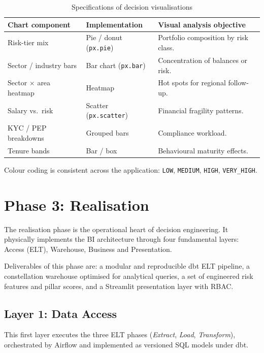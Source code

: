 \begin{table}[H]
\centering
\caption{Specifications of decision visualisations}
\label{tab:kpis_graphiques}
\renewcommand{\arraystretch}{1.25}
\scriptsize
\begin{tabular}{|p{3.2cm}|p{3.6cm}|p{7.0cm}|}
\hline
\rowcolor{blue!15}
\textbf{Chart component} & \textbf{Implementation} & \textbf{Visual analysis objective} \\
\hline
Risk-tier mix & Pie / donut (\texttt{px.pie}) & Portfolio composition by risk class. \\
\hline
Sector / industry bars & Bar chart (\texttt{px.bar}) & Concentration of balances or risk. \\
\hline
Sector $\times$ area heatmap & Heatmap & Hot spots for regional follow-up. \\
\hline
Salary vs.\ risk & Scatter (\texttt{px.scatter}) & Financial fragility patterns. \\
\hline
KYC / PEP breakdowns & Grouped bars & Compliance workload. \\
\hline
Tenure bands & Bar / box & Behavioural maturity effects. \\
\hline
\end{tabular}
\end{table}

Colour coding is consistent across the application:
\texttt{LOW}, \texttt{MEDIUM},
\texttt{HIGH}, \texttt{VERY\_HIGH}.

\section{Phase 3: Realisation}
\label{sec:gimsi_phase3}
The realisation phase is the operational heart of decision engineering. It
physically implements the BI architecture through four fundamental layers:
Access (ELT), Warehouse, Business and Presentation.

Deliverables of this phase are: a modular and reproducible dbt ELT pipeline, a
constellation warehouse optimised for analytical queries, a set of engineered
risk features and pillar scores, and a Streamlit presentation layer with RBAC.

\subsection{Layer 1: Data Access}
This first layer executes the three ELT phases (\textit{Extract},
\textit{Load}, \textit{Transform}), orchestrated by Airflow and implemented as
versioned SQL models under dbt.

